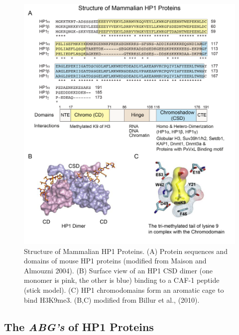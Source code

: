 \documentclass[onehalf,12pt]{beavtex}
\begin{document}
  \begin{figure}
  
  {\centering \includegraphics[width=1\linewidth, ]{./figure/introduction/HP1structure} 
  
  }
  
  \caption[Structure of Mammalian HP1 Proteins]{Structure of Mammalian HP1 Proteins. (A) Protein sequences and domains of mouse HP1 proteins (modified from Maison and Almouzni 2004). (B) Surface view of an HP1 CSD dimer (one monomer is pink, the other is blue) binding to a CAF-1 peptide (stick model). (C) HP1 chromodomains form an aromatic cage to bind H3K9me3. (B,C) modified from Billur et al., (2010).}\label{fig:HP1structure}
  \end{figure}
  
  \subsection*{\texorpdfstring{The \emph{ABG's} of HP1
  Proteins}{The ABG's of HP1 Proteins}}\label{the-abgs-of-hp1-proteins}
  
\end{document}
